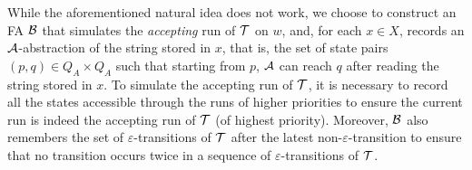             While the aforementioned natural idea does not work,  we choose to construct an FA $\mathcal{B}$ that simulates the \emph{accepting} run of $\mathcal{T}$ on $w$, and, for each $x \in X$, records an $\mathcal{A}$-abstraction of the string stored in $x$, that is, the set of state pairs $(p, q) \in Q_A \times Q_A$ such that starting from $p$, $\mathcal{A}$ can reach $q$ after reading the string stored in $x$.
            To simulate the accepting run of $\mathcal{T}$, it is necessary to record all the states accessible through the runs of higher priorities to ensure the current run is indeed the accepting run of $\mathcal{T}$ (of highest priority). Moreover, $\mathcal{B}$ also remembers the set of $\varepsilon$-transitions of $\mathcal{T}$ after the latest non-$\varepsilon$-transition to ensure that no transition occurs twice in a sequence of $\varepsilon$-transitions of $\mathcal{T}$.

